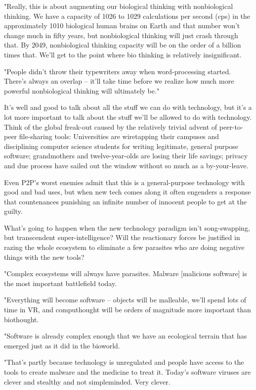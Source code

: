 "Really, this is about augmenting our biological thinking with
nonbiological thinking. We have a capacity of 1026 to 1029
calculations per second (cps) in the approximately 1010 biological
human brains on Earth and that number won't change much in fifty
years, but nonbiological thinking will just crash through that. By
2049, nonbiological thinking capacity will be on the order of a
billion times that. We'll get to the point where bio thinking is
relatively insignificant.

"People didn't throw their typewriters away when word-processing
started. There's always an overlap -- it'll take time before we
realize how much more powerful nonbiological thinking will
ultimately be."

It's well and good to talk about all the stuff we can do with
technology, but it's a lot more important to talk about the stuff
we'll be allowed to do with technology. Think of the global
freak-out caused by the relatively trivial advent of peer-to-peer
file-sharing tools: Universities are wiretapping their campuses and
disciplining computer science students for writing legitimate,
general purpose software; grandmothers and twelve-year-olds are
losing their life savings; privacy and due process have sailed out
the window without so much as a by-your-leave.

Even P2P's worst enemies admit that this is a general-purpose
technology with good and bad uses, but when new tech comes along it
often engenders a response that countenances punishing an infinite
number of innocent people to get at the guilty.

What's going to happen when the new technology paradigm isn't
song-swapping, but transcendent super-intelligence? Will the
reactionary forces be justified in razing the whole ecosystem to
eliminate a few parasites who are doing negative things with the
new tools?

"Complex ecosystems will always have parasites. Malware [malicious
software] is the most important battlefield today.

"Everything will become software -- objects will be malleable,
we'll spend lots of time in VR, and computhought will be orders of
magnitude more important than biothought.

"Software is already complex enough that we have an ecological
terrain that has emerged just as it did in the bioworld.

"That's partly because technology is unregulated and people have
access to the tools to create malware and the medicine to treat it.
Today's software viruses are clever and stealthy and not
simpleminded. Very clever.

